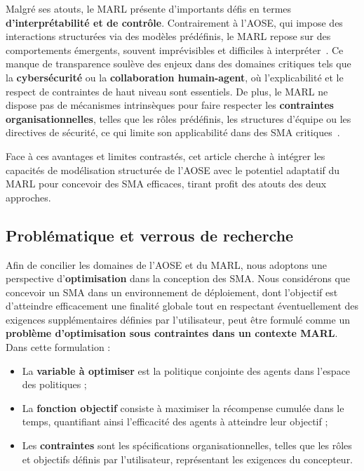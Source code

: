 \documentclass[pdflatex,sn-mathphys-num]{sn-jnl}%
\theoremstyle{thmstyleone}%
\theoremstyle{thmstyletwo}%
\theoremstyle{thmstylethree}%
\begin{document}
Malgré ses atouts, le MARL présente d’importants défis en termes \textbf{d’interprétabilité et de contrôle}. Contrairement à l’AOSE, qui impose des interactions structurées via des modèles prédéfinis, le MARL repose sur des comportements émergents, souvent imprévisibles et difficiles à interpréter~\cite{Du2022}. Ce manque de transparence soulève des enjeux dans des domaines critiques tels que la \textbf{cybersécurité} ou la \textbf{collaboration humain-agent}, où l’explicabilité et le respect de contraintes de haut niveau sont essentiels. De plus, le MARL ne dispose pas de mécanismes intrinsèques pour faire respecter les \textbf{contraintes organisationnelles}, telles que les rôles prédéfinis, les structures d’équipe ou les directives de sécurité, ce qui limite son applicabilité dans des SMA critiques~\cite{Nguyen2020}.

Face à ces avantages et limites contrastés, cet article cherche à intégrer les capacités de modélisation structurée de l’AOSE avec le potentiel adaptatif du MARL pour concevoir des SMA efficaces, tirant profit des atouts des deux approches.

\subsection{Problématique et verrous de recherche}

Afin de concilier les domaines de l’AOSE et du MARL, nous adoptons une perspective d’\textbf{optimisation} dans la conception des SMA. Nous considérons que concevoir un SMA dans un environnement de déploiement, dont l’objectif est d’atteindre efficacement une finalité globale tout en respectant éventuellement des exigences supplémentaires définies par l’utilisateur, peut être formulé comme un \textbf{problème d’optimisation sous contraintes dans un contexte MARL}. Dans cette formulation :
\begin{itemize}
    \item La \textbf{variable à optimiser} est la politique conjointe des agents dans l’espace des politiques ;
    \item La \textbf{fonction objectif} consiste à maximiser la récompense cumulée dans le temps, quantifiant ainsi l’efficacité des agents à atteindre leur objectif ;
    \item Les \textbf{contraintes} sont les spécifications organisationnelles, telles que les rôles et objectifs définis par l’utilisateur, représentant les exigences du concepteur.
\end{itemize}
\end{document}
